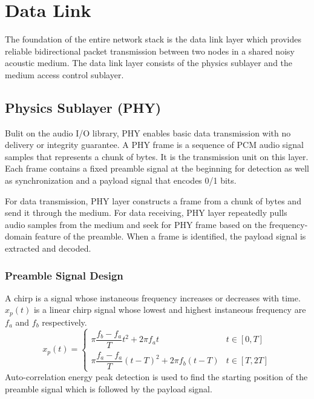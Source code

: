 \section{Data Link}
The foundation of the entire network stack is the data link layer which
provides reliable bidirectional packet transmission between two nodes in a shared noisy acoustic medium.
The data link layer consists of the physics sublayer and the medium access control sublayer.

\subsection{Physics Sublayer (PHY)}
Bulit on the audio I/O library, PHY enables basic data transmission with no delivery or integrity guarantee.
A PHY frame is a sequence of PCM audio signal samples that represents a chunk of bytes. It is the transmission unit on this layer.
Each frame contains a fixed preamble signal at the beginning for detection as well as synchronization and a payload signal that encodes 0/1 bits.\par
For data transmission, PHY layer constructs a frame from a chunk of bytes and send it through the medium.
For data receiving, PHY layer repeatedly pulls audio samples from the medium and seek for PHY frame based on the frequency-domain feature of the preamble.
When a frame is identified, the payload signal is extracted and decoded.
\subsubsection{Preamble Signal Design}
A chirp is a signal whose instaneous frequency increases or decreases with time.
$x_p(t)$ is a linear chirp signal whose lowest and highest instaneous frequency are $f_a$ and $f_b$ respectively.
\[
	x_p(t) = \begin{cases}
		\pi \dfrac{f_b-f_a}{T} t^2       + 2\pi f_a t     & t\in [0,T]  \\
		\pi \dfrac{f_a-f_a}{T} {(t-T)}^2 + 2\pi f_b (t-T) & t\in [T,2T]
	\end{cases}
\]
Auto-correlation energy peak detection is used to find the starting position of the preamble signal which is followed by the payload signal.

